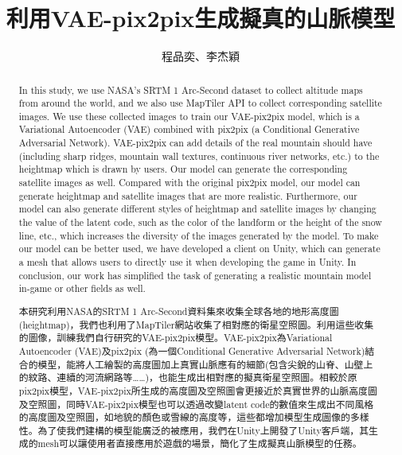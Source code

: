\documentclass[a4paper, 12pt]{article}
\title{利用VAE-pix2pix生成擬真的山脈模型}
\author{程品奕、李杰穎}
\begin{document}

\tableofcontents
\newpage

\begin{abstract}
In this study, we use NASA's SRTM 1 Arc-Second dataset to collect altitude maps from around the world, and we also use MapTiler API to collect corresponding satellite images. We use these collected images to train our VAE-pix2pix model, which is a Variational Autoencoder (VAE) combined with pix2pix (a Conditional Generative Adversarial Network). VAE-pix2pix can add details of the real mountain should have (including sharp ridges, mountain wall textures, continuous river networks, etc.) to the heightmap which is drawn by users. Our model can generate the corresponding satellite images as well. Compared with the original pix2pix model, our model can generate heightmap and satellite images that are more realistic. Furthermore, our model can also generate different styles of heightmap and satellite images by changing the value of the latent code, such as the color of the landform or the height of the snow line, etc., which increases the diversity of the images generated by the model. To make our model can be better used, we have developed a client on Unity, which can generate a mesh that allows users to directly use it when developing the game in Unity. In conclusion, our work has simplified the task of generating a realistic mountain model in-game or other fields as well.
\end{abstract}

\renewcommand{\abstractname}{摘要}
\begin{abstract}
本研究利用NASA的SRTM 1 Arc-Second資料集來收集全球各地的地形高度圖(heightmap)，我們也利用了MapTiler網站收集了相對應的衛星空照圖。利用這些收集的圖像，訓練我們自行研究的VAE-pix2pix模型。VAE-pix2pix為Variational Autoencoder (VAE)及pix2pix (為一個Conditional Generative Adversarial Network)結合的模型，能將人工繪製的高度圖加上真實山脈應有的細節(包含尖銳的山脊、山壁上的紋路、連續的河流網路等……)，也能生成出相對應的擬真衛星空照圖。相較於原pix2pix模型，VAE-pix2pix所生成的高度圖及空照圖會更接近於真實世界的山脈高度圖及空照圖，同時VAE-pix2pix模型也可以透過改變latent code的數值來生成出不同風格的高度圖及空照圖，如地貌的顏色或雪線的高度等，這些都增加模型生成圖像的多樣性。為了使我們建構的模型能廣泛的被應用，我們在Unity上開發了Unity客戶端，其生成的mesh可以讓使用者直接應用於遊戲的場景，簡化了生成擬真山脈模型的任務。
\end{abstract}
\newpage
{}
\end{document}
